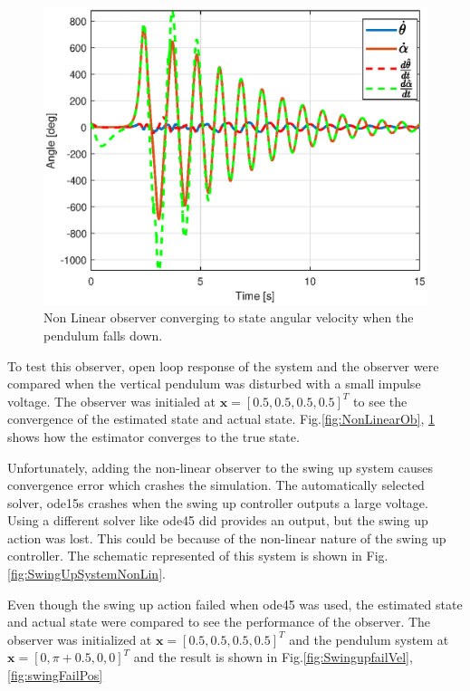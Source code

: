 \documentclass[superscriptaddress,floatfix,reprint,amssymb, amsmath,aps, pre]{revtex4-1}
\newcommand{\bx}{\textbf{x}}
\begin{document}
{{{            \begin{figure}
                \includegraphics[width = \linewidth]{NonLinearObVel.eps}
                \caption{Non Linear observer converging to state angular velocity when the pendulum falls down.}
                \label{fig:NonLinearObVel}
            \end{figure}

            To test this observer, open loop response of the system and the observer were compared when the vertical pendulum was disturbed with a small impulse voltage. The observer was initialed at \(\bx = [0.5,0.5,0.5,0.5]^T\) to see the convergence of the estimated state and actual state. Fig.\ref{fig:NonLinearOb}, \ref{fig:NonLinearObVel} shows how the estimator converges to the true state. 

            Unfortunately, adding the non-linear observer to the swing up system causes convergence error which crashes the simulation. The automatically selected solver, ode15s crashes when the swing up controller outputs a large voltage. Using a different solver like ode45 did provides an output, but the swing up action was lost. This could be because of the non-linear nature of the swing up controller. The schematic represented of this system is shown in Fig.\ref{fig:SwingUpSystemNonLin}.

            Even though the swing up action failed when ode45 was used, the estimated state and actual state were compared to see the performance of the observer. The observer was initialized at \(\bx = [0.5,0.5,0.5,0.5]^T\) and the pendulum system at \(\bx = [0,\pi + 0.5,0,0]^T\) and the result is shown in Fig.\ref{fig:SwingupfailVel}, \ref{fig:swingFailPos}

}}}
\end{document}
